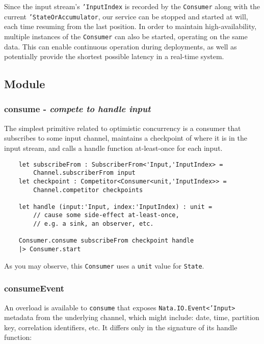 \documentclass{article}
\begin{document}
Since the input stream's \texttt{'InputIndex} is recorded by the \texttt{Consumer} along with the current \texttt{'StateOrAccumulator}, our service can be stopped and started at will, each time resuming from the last position.  In order to maintain high-availability, multiple instances of the \texttt{Consumer} can also be started, operating on the same data.  This can enable continuous operation during deployments, as well as potentially provide the shortest possible latency in a real-time system.


\subsection{Module}
\subsubsection{consume - \textit{compete to handle input}}
The simplest primitive related to optimistic concurrency is a consumer that subscribes to some input channel, maintains a checkpoint of where it is in the input stream, and calls a handle function at-least-once for each input.

\begin{verbatim}
    let subscribeFrom : SubscriberFrom<'Input,'InputIndex> =
        Channel.subscriberFrom input
    let checkpoint : Competitor<Consumer<unit,'InputIndex>> =
        Channel.competitor checkpoints
    
    let handle (input:'Input, index:'InputIndex) : unit =
        // cause some side-effect at-least-once,
        // e.g. a sink, an observer, etc.
    
    Consumer.consume subscribeFrom checkpoint handle
    |> Consumer.start
\end{verbatim}

As you may observe, this \texttt{Consumer} uses a \texttt{unit} value for \texttt{State}.

\subsubsection{consumeEvent}

An overload is available to \texttt{consume} that exposes \texttt{Nata.IO.Event<'Input>} metadata from the underlying channel, which might include: date, time, partition key, correlation identifiers, etc.  It differs only in the signature of its handle function:
\end{document}
